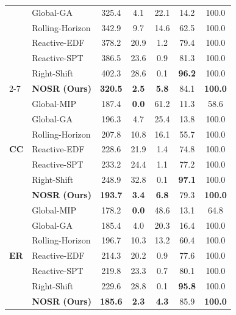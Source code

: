 \documentclass[manuscript,screen,review]{acmart}
\begin{document}
\begin{table}[t]
\begin{tabular}{@{}llccccc@{}}
& Global-GA       & 325.4          & 4.1          & 22.1 & 14.2          & 100.0         \\
& Rolling-Horizon & 342.9          & 9.7          & 14.6 & 62.5          & 100.0         \\
& Reactive-EDF    & 378.2          & 20.9         & 1.2  & 79.4          & 100.0         \\
& Reactive-SPT    & 386.5          & 23.6         & 0.9  & 81.3          & 100.0         \\
& Right-Shift     & 402.3          & 28.6         & 0.1  & \textbf{96.2} & 100.0         \\
\cmidrule{2-7}
& \textbf{NOSR (Ours)} & \textbf{320.5} & \textbf{2.5} & \textbf{5.8} & 84.1 & \textbf{100.0} \\
\midrule
\multirow{7}{*}{\textbf{CC}}
& Global-MIP      & 187.4          & \textbf{0.0} & 61.2 & 11.3          & 58.6          \\
& Global-GA       & 196.3          & 4.7          & 25.4 & 13.8          & 100.0         \\
& Rolling-Horizon & 207.8          & 10.8         & 16.1 & 55.7          & 100.0         \\
& Reactive-EDF    & 228.6          & 21.9         & 1.4  & 74.8          & 100.0         \\
& Reactive-SPT    & 233.2          & 24.4         & 1.1  & 77.2          & 100.0         \\
& Right-Shift     & 248.9          & 32.8         & 0.1  & \textbf{97.1} & 100.0         \\
\cmidrule{2-7}
& \textbf{NOSR (Ours)} & \textbf{193.7} & \textbf{3.4} & \textbf{6.8} & 79.3 & \textbf{100.0} \\
\midrule
\multirow{7}{*}{\textbf{ER}}
& Global-MIP      & 178.2          & \textbf{0.0} & 48.6 & 13.1          & 64.8          \\
& Global-GA       & 185.4          & 4.0          & 20.3 & 16.4          & 100.0         \\
& Rolling-Horizon & 196.7          & 10.3         & 13.2 & 60.4          & 100.0         \\
& Reactive-EDF    & 214.3          & 20.2         & 0.9  & 77.6          & 100.0         \\
& Reactive-SPT    & 219.8          & 23.3         & 0.7  & 80.1          & 100.0         \\
& Right-Shift     & 229.6          & 28.8         & 0.1  & \textbf{95.8} & 100.0         \\
\cmidrule{2-7}
& \textbf{NOSR (Ours)} & \textbf{185.6} & \textbf{2.3} & \textbf{4.3} & 85.9 & \textbf{100.0} \\
\bottomrule
\end{tabular}
\end{table}
\end{document}
